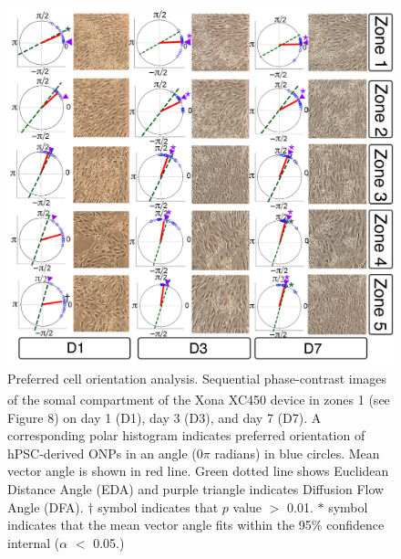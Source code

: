 \documentclass[review]{elsarticle}
\begin{document}
\begin{figure}
	\begin{center}
		\includegraphics[width=13cm]{Fig_8.jpg}
	\end{center}
	\caption{Preferred cell orientation analysis. Sequential phase-contrast images of the somal compartment of the Xona\textsuperscript{\texttrademark} XC450 device in zones 1 (see Figure 8) on day 1 (D1), day 3 (D3), and day 7 (D7). A corresponding polar histogram indicates preferred orientation of hPSC-derived ONPs in an angle (0$\pi$ radians) in blue circles. Mean vector angle is shown in red line. Green dotted line shows Euclidean Distance Angle (EDA) and purple triangle indicates Diffusion Flow Angle (DFA). $\dagger$ symbol indicates that $p$ value $>$ 0.01. $\ast$ symbol indicates that the mean vector angle fits within the 95\% confidence internal ($\alpha$ $<$ 0.05.)}
\end{figure}
\end{document}

